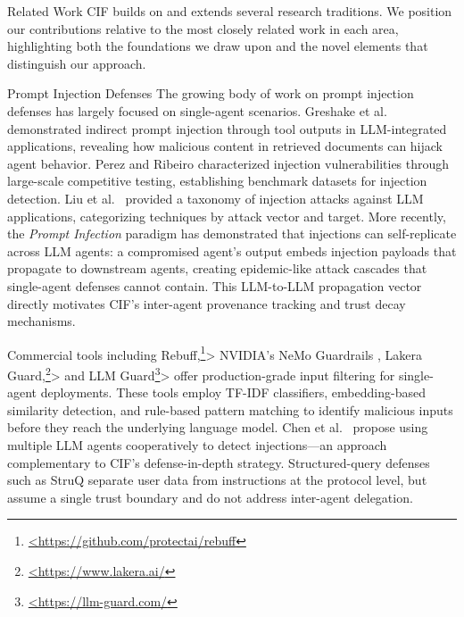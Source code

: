 \documentclass[
  ignorenonframetext,
]{beamer}
\author{\texorpdfstring{}{}}
\date{}
\begin{document}
\begin{frame}
\newpage
\end{frame}

\begin{frame}{Related Work}
\protect{}\label{sec:related-work}
CIF builds on and extends several research traditions. We position our
contributions relative to the most closely related work in each area,
highlighting both the foundations we draw upon and the novel elements
that distinguish our approach.

\begin{block}{Prompt Injection Defenses}
\protect{}\label{prompt-injection-defenses}
The growing body of work on prompt injection defenses has largely
focused on single-agent scenarios. Greshake et
al.~\cite{greshake2023indirect} demonstrated indirect prompt injection
through tool outputs in LLM-integrated applications, revealing how
malicious content in retrieved documents can hijack agent behavior.
Perez and Ribeiro \cite{perez2023hackaprompt} characterized injection
vulnerabilities through large-scale competitive testing, establishing
benchmark datasets for injection detection. Liu et
al.~\cite{liu2023prompt} provided a taxonomy of injection attacks
against LLM applications, categorizing techniques by attack vector and
target. More recently, the \emph{Prompt Infection} paradigm
\cite{lee2025promptinfection} has demonstrated that injections can
self-replicate across LLM agents: a compromised agent's output embeds
injection payloads that propagate to downstream agents, creating
epidemic-like attack cascades that single-agent defenses cannot contain.
This LLM-to-LLM propagation vector directly motivates CIF's inter-agent
provenance tracking and trust decay mechanisms.

Commercial tools including
Rebuff,\footnote{\url{<https://github.com/protectai/rebuff}}\textgreater{}
NVIDIA's NeMo Guardrails \cite{rebedea2023nemo}, Lakera
Guard,\footnote{\url{<https://www.lakera.ai/}}\textgreater{} and LLM
Guard\footnote{\url{<https://llm-guard.com/}}\textgreater{} offer
production-grade input filtering for single-agent deployments. These
tools employ TF-IDF classifiers, embedding-based similarity detection,
and rule-based pattern matching to identify malicious inputs before they
reach the underlying language model. Chen et
al.~\cite{multiagent2025defense} propose using multiple LLM agents
cooperatively to detect injections---an approach complementary to CIF's
defense-in-depth strategy. Structured-query defenses such as StruQ
\cite{struq2025} separate user data from instructions at the protocol
level, but assume a single trust boundary and do not address inter-agent
delegation.


\end{block}
\end{frame}
\end{document}
